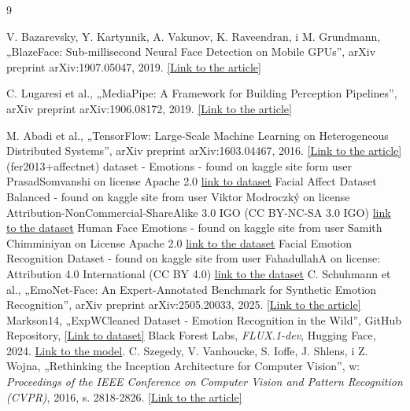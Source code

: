\documentclass{article}
\begin{document}
\begin{thebibliography}{9}

    V. Bazarevsky, Y. Kartynnik, A. Vakunov, K. Raveendran, i M. Grundmann, „BlazeFace: Sub-millisecond Neural Face Detection on Mobile GPUs”, arXiv preprint arXiv:1907.05047, 2019. \href{https://arxiv.org/abs/1907.05047}{[Link to the article]} 
    
    C. Lugaresi et al., „MediaPipe: A Framework for Building Perception Pipelines”, arXiv preprint arXiv:1906.08172, 2019. \href{https://arxiv.org/abs/1906.08172}{[Link to the article]} 
    
    M. Abadi et al., „TensorFlow: Large-Scale Machine Learning on Heterogeneous Distributed Systems”, arXiv preprint arXiv:1603.04467, 2016. \href{https://www.tensorflow.org/}{[Link to the article]} 
    (fer2013+affectnet) dataset - Emotions - found on kaggle site form user PrasadSomvanshi on license Apache 2.0 \href{https://www.kaggle.com/datasets/prasadsomvanshih/fer2013-affectnet-dataset-emotions/data?fbclid=IwY2xjawQOZipleHRuA2FlbQIxMQBzcnRjBmFwcF9pZAEwAAEeeakwhP0rBKTNC9dH0_7OUlwZgdrUVN_qAnQQVBijJ42LuroL_KM-VX6xPaM_aem_M1YE76_0EMbx7yb1aUcGzQ}{link to dataset}
    Facial Affect Dataset Balanced - found on kaggle site from user Viktor Modroczký on license Attribution-NonCommercial-ShareAlike 3.0 IGO (CC BY-NC-SA 3.0 IGO) \href{https://www.kaggle.com/datasets/viktormodroczky/facial-affect-dataset}{link to the dataset}
    Human Face Emotions - found on kaggle site from user Samith Chimminiyan on License Apache 2.0 \href{https://www.kaggle.com/datasets/samithsachidanandan/human-face-emotions?fbclid=IwY2xjawQRS4pleHRuA2FlbQIxMQBzcnRjBmFwcF9pZAEwAAEeFoE2tKxAJHbQbfM4sPKdUYLckVtJX8uKNkO-qEWGZ1SNsIFSDW6J9IakJq8_aem_CrDZH0whQgTOAbaWuiPq2w}{link to the dataset}
    Facial Emotion Recognition Dataset - found on kaggle site from user FahadullahA on license: Attribution 4.0 International (CC BY 4.0) \href{https://www.kaggle.com/datasets/fahadullaha/facial-emotion-recognition-dataset?fbclid=IwY2xjawQRS4xleHRuA2FlbQIxMQBzcnRjBmFwcF9pZAEwAAEeNf73G1bYjDj_hAsEGtd7YcKzrPsfmEE5SWb8qHwRVCud6sVvNcniatFb4Ac_aem_A_MxoTH_SaY2XDt-hgU_7Q}{link to the dataset}
    C. Schuhmann et al., „EmoNet-Face: An Expert-Annotated Benchmark for Synthetic Emotion Recognition”, arXiv preprint arXiv:2505.20033, 2025. \href{https://arxiv.org/abs/2505.20033}{[Link to the article]}
    Markson14, „ExpWCleaned Dataset - Emotion Recognition in the Wild”, GitHub Repository, \href{https://github.com/markson14/ExpWCleaned}{[Link to dataset]} 
    Black Forest Labs, \textit{FLUX.1-dev}, Hugging Face, 2024. 
    \href{https://huggingface.co/black-forest-labs/FLUX.1-dev}{Link to the model}.
    C. Szegedy, V. Vanhoucke, S. Ioffe, J. Shlens, i Z. Wojna, „Rethinking the Inception Architecture for Computer Vision”, w: \textit{Proceedings of the IEEE Conference on Computer Vision and Pattern Recognition (CVPR)}, 2016, s. 2818-2826. \href{https://arxiv.org/abs/1512.00567}{[Link to the article]}
    

\end{thebibliography}
\end{document}
